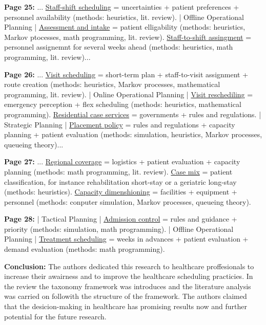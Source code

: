     \textbf{Page 25:}
    ... \underline{Staff-shift scheduling} = uncertainties + patient preferences + personnel availability (methods: heuristics, lit. review). | Offline Operational Planning | \underline{Assessment and intake} = patient elligability (methods: heuristics, Markov ptocesses, math programming, lit. review). \underline{Staff-to-shift assingment} = personnel assignemnt for several weeks ahead (methods: heuristics, math programming, lit. review)...
    
    \textbf{Page 26:}
    ... \underline{Visit scheduling} = short-term plan + staff-to-visit assignment + route creation (methods: heuristics, Markov processes, mathematical programming, lit. review). | Online Operational Planning | \underline{Visit reschediling} = emergency perception + flex scheduling (methods: heuristics, mathematical programming). \underline{Residential case services} = governments + rules and regulations. | Strategic Planning | \underline{Placement policy} = rules and regulations + capacity planning + patient evaluation (methods: simulation, heuristics, Markov processes, queueing theory)... 
    
    \textbf{Page 27:}
    ... \underline{Regional coverage} = logistics + patient evaluation + capacity planning (methods: math programming, lit. review). \underline{Case mix} = patient classification, for instance rehabilitation short-stay or a geriatric long-stay (methods: heuristics). \underline{Capacity dimenshioning} = facilities + equipment + personnel (methods: conputer simulation, Markov processes, queueing theory). 
    
    \textbf{Page 28:}
    | Tactical Planning | \underline{Admission control} = rules and guidance + priority (methods: simulation, math programming). | Offline Operational Planning | \underline{Treatment scheduling} = weeks in advances + patient evaluation + demand evaluation (methods: math programming).
    
    \textbf{Conclusion:}
    The authors dedicated this research to healthcare proffesionals to increase their awairness and to improve the healthcare scheduling practicies. In the review the taxonomy framework was introduces and the literature analysis was carried on followith the structure of the framework. The authors claimed that the desicion-making in healthcare has promising results now and further potential for the future research.
    